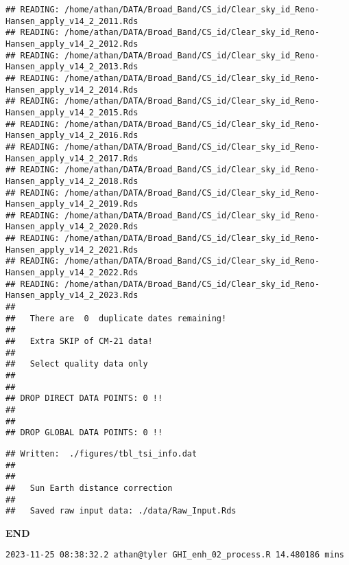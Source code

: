 \documentclass[
  10pt,
  a4paper,oneside]{article}
\begin{document}
\begin{verbatim}
## READING: /home/athan/DATA/Broad_Band/CS_id/Clear_sky_id_Reno-Hansen_apply_v14_2_2011.Rds 
## READING: /home/athan/DATA/Broad_Band/CS_id/Clear_sky_id_Reno-Hansen_apply_v14_2_2012.Rds 
## READING: /home/athan/DATA/Broad_Band/CS_id/Clear_sky_id_Reno-Hansen_apply_v14_2_2013.Rds 
## READING: /home/athan/DATA/Broad_Band/CS_id/Clear_sky_id_Reno-Hansen_apply_v14_2_2014.Rds 
## READING: /home/athan/DATA/Broad_Band/CS_id/Clear_sky_id_Reno-Hansen_apply_v14_2_2015.Rds 
## READING: /home/athan/DATA/Broad_Band/CS_id/Clear_sky_id_Reno-Hansen_apply_v14_2_2016.Rds 
## READING: /home/athan/DATA/Broad_Band/CS_id/Clear_sky_id_Reno-Hansen_apply_v14_2_2017.Rds 
## READING: /home/athan/DATA/Broad_Band/CS_id/Clear_sky_id_Reno-Hansen_apply_v14_2_2018.Rds 
## READING: /home/athan/DATA/Broad_Band/CS_id/Clear_sky_id_Reno-Hansen_apply_v14_2_2019.Rds 
## READING: /home/athan/DATA/Broad_Band/CS_id/Clear_sky_id_Reno-Hansen_apply_v14_2_2020.Rds 
## READING: /home/athan/DATA/Broad_Band/CS_id/Clear_sky_id_Reno-Hansen_apply_v14_2_2021.Rds 
## READING: /home/athan/DATA/Broad_Band/CS_id/Clear_sky_id_Reno-Hansen_apply_v14_2_2022.Rds 
## READING: /home/athan/DATA/Broad_Band/CS_id/Clear_sky_id_Reno-Hansen_apply_v14_2_2023.Rds 
## 
##   There are  0  duplicate dates remaining!
## 
##   Extra SKIP of CM-21 data!
## 
##   Select quality data only
## 
## 
## DROP DIRECT DATA POINTS: 0 !!
## 
## 
## DROP GLOBAL DATA POINTS: 0 !!
\end{verbatim}

\begin{verbatim}
## Written:  ./figures/tbl_tsi_info.dat 
## 
## 
##   Sun Earth distance correction
## 
##   Saved raw input data: ./data/Raw_Input.Rds
\end{verbatim}

\textbf{END}

\begin{verbatim}
2023-11-25 08:38:32.2 athan@tyler GHI_enh_02_process.R 14.480186 mins
\end{verbatim}
\end{document}
